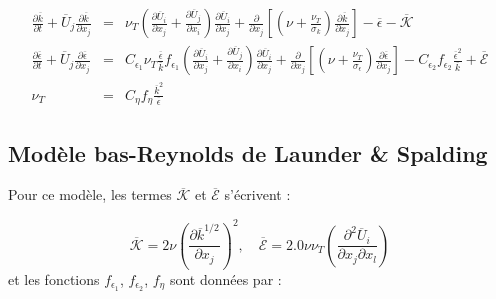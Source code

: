 \begin{subequations}

\begin{eqnarray}
\frac{\partial\overline{k}}{\partial t}+\overline{U}_{j}\frac{\partial\overline{k}}{\partial x_{j}} & = & \nu_{T}\left(\frac{\partial\overline{U}_{i}}{\partial x_{j}}+\frac{\partial\overline{U}_{j}}{\partial x_{i}}\right)\frac{\partial\overline{U}_{i}}{\partial x_{j}}+\frac{\partial}{\partial x_{j}}\left[\left(\nu+\frac{\nu_{T}}{\sigma_{k}}\right)\frac{\partial\overline{k}}{\partial x_{j}}\right]-\overline{\epsilon}-\overline{\mathcal{K}}\label{eq:EnerCinTurb_k_LowRe}\\
\frac{\partial\overline{\epsilon}}{\partial t}+\overline{U}_{j}\frac{\partial\overline{\epsilon}}{\partial x_{j}} & = & C_{\epsilon_{1}}\nu_{T}\frac{\overline{\epsilon}}{\overline{k}}f_{\epsilon_{1}}\left(\frac{\partial\overline{U}_{i}}{\partial x_{j}}+\frac{\partial\overline{U}_{j}}{\partial x_{i}}\right)\frac{\partial\overline{U}_{i}}{\partial x_{j}}+\frac{\partial}{\partial x_{j}}\left[\left(\nu+\frac{\nu_{T}}{\sigma_{\epsilon}}\right)\frac{\partial\overline{\epsilon}}{\partial x_{j}}\right]-C_{\epsilon_{2}}f_{\epsilon_{2}}\frac{\overline{\epsilon}^{2}}{\overline{k}}+\overline{\mathcal{E}}\label{eq:TauxDissip_eps_LowRe}\\
\nu_{T} & = & C_{\eta}f_{\eta}\frac{\overline{k}^{2}}{\overline{\epsilon}}\label{eq:Nu_T_LowRe}
\end{eqnarray}


\end{subequations}


\subsection*{Mod\`ele \og bas-Reynolds \fg{} de Launder \& Spalding \cite{Launder-Spalding_NumCompTurbFlow1974}}

Pour ce mod\`ele, les termes $\overline{\mathcal{K}}$ et $\overline{\mathcal{E}}$
s'\'ecrivent \cite[Eqs. (2.3-4) et (2.3-5)]{Launder-Spalding_NumCompTurbFlow1974}
:

\begin{equation}
\overline{\mathcal{K}}=2\nu\left(\frac{\partial\overline{k}^{1/2}}{\partial x_{j}}\right)^{2},\quad\overline{\mathcal{E}}=2.0\nu\nu_{T}\left(\frac{\partial^{2}\overline{U}_{i}}{\partial x_{j}\partial x_{l}}\right)\label{eq:K-E_Model1}
\end{equation}
et les fonctions $f_{\epsilon_{1}}$, $f_{\epsilon_{2}}$, $f_{\eta}$
sont donn\'ees par \cite[Eqs. (2.3-6) et (2.3-7)]{Launder-Spalding_NumCompTurbFlow1974}
:

